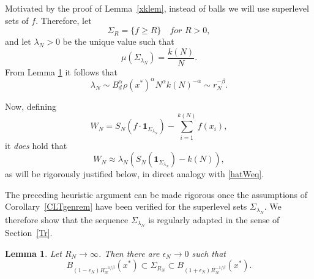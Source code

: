 \documentclass[11pt,twoside,a4paper,reqno]{amsart}
\newtheorem{lemma}[theorem]{Lemma}
\def\one{{\mathbf{1}}}
\begin{document}
Motivated by the proof of Lemma~\ref{xklem}, instead of balls we will use superlevel sets of $f$. Therefore, let
\begin{equation*}
\Sigma_R = \{f\geq R\} \quad \textit{for } R>0,
\end{equation*}
and let $\lambda_N>0$ be the unique value such that
\begin{equation*}
\mu(\Sigma_{\lambda_N})=\frac{k(N)}{N}.
\end{equation*}
From Lemma \ref{inclanlem} it follows that
\begin{equation*}
\lambda_N \sim B_d^{\alpha} \rho(x^*)^{\alpha} N^{\alpha} k(N)^{-\alpha} \sim r_N^{-\beta}.
\end{equation*}



Now, defining
\begin{equation}\label{Wdef}
W_N = S_N\left(f \cdot \one_{\Sigma_{\lambda_N}}\right) - \sum_{i=1}^{k(N)} f(x_i),
\end{equation}
it \emph{does} hold that
\begin{equation}\label{Weq}
W_N \approx \lambda_N \left(S_N(\one_{\Sigma_{\lambda_N}}) - k(N) \right),
\end{equation}
as will be rigorously justified below, in direct analogy with \eqref{hatWeq}.

The preceding heuristic argument can be made rigorous once the assumptions of Corollary~\ref{CLTgenrem} have been verified for the superlevel sets $\Sigma_{\lambda_N}$. We therefore show that the sequence $\Sigma_{\lambda_N}$ is regularly adapted in the sense of Section~\ref{Tr}.



\begin{lemma}\label{inclanlem}
Let $R_N\rightarrow \infty$. Then there are $\epsilon_N \rightarrow 0$ such that
\begin{equation}\label{inclanlemeq}
B_{(1-\epsilon_N) R_N^{-1/\beta}}(x^*) \subset \Sigma_{R_N} \subset B_{(1+\epsilon_N) R_N^{-1/\beta}}(x^*).
\end{equation}
\end{lemma}
\end{document}
